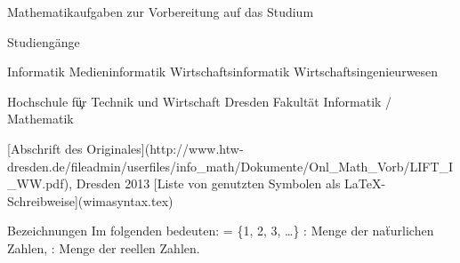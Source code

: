 
Mathematikaufgaben
zur Vorbereitung auf das Studium

Studiengänge

Informatik
Medieninformatik
Wirtschaftsinformatik
Wirtschaftsingenieurwesen


Hochschule fü̧r
Technik und Wirtschaft Dresden
Fakultät Informatik / Mathematik

[Abschrift des Originales](http://www.htw-dresden.de/fileadmin/userfiles/info_math/Dokumente/Onl_Math_Vorb/LIFT_I_WW.pdf), Dresden 2013
[Liste von genutzten Symbolen als LaTeX-Schreibweise](wimasyntax.tex)


Bezeichnungen
Im folgenden bedeuten:
 = \{1, 2, 3, \ldots \} : Menge der naẗurlichen Zahlen,
: Menge der reellen Zahlen.

